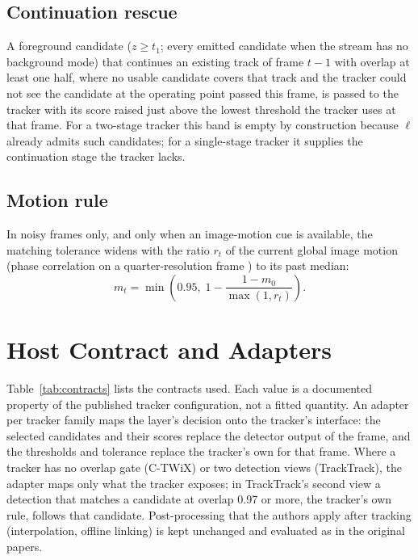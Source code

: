 \documentclass[journal]{new-aiaa}
\begin{document}
\subsection{Continuation rescue}
A foreground candidate ($z\ge t_1$; every emitted candidate when the stream has no background mode) that continues an existing track of frame $t-1$ with overlap at least one half, where no usable candidate covers that track and the tracker could not see the candidate at the operating point passed this frame, is passed to the tracker with its score raised just above the lowest threshold the tracker uses at that frame. For a two-stage tracker this band is empty by construction because $\ell$ already admits such candidates; for a single-stage tracker it supplies the continuation stage the tracker lacks.

\subsection{Motion rule}
In noisy frames only, and only when an image-motion cue is available, the matching tolerance widens with the ratio $r_t$ of the current global image motion (phase correlation on a quarter-resolution frame \cite{reddy1996phasecorr}) to its past median:
\begin{equation}
m_t=\min\left(0.95,\; 1-\frac{1-m_0}{\max(1,r_t)}\right).
\label{eq:motion}
\end{equation}

\section{Host Contract and Adapters}\label{sec:contract}
Table~\ref{tab:contracts} lists the contracts used. Each value is a documented property of the published tracker configuration, not a fitted quantity. An adapter per tracker family maps the layer's decision onto the tracker's interface: the selected candidates and their scores replace the detector output of the frame, and the thresholds and tolerance replace the tracker's own for that frame. Where a tracker has no overlap gate (C-TWiX) or two detection views (TrackTrack), the adapter maps only what the tracker exposes; in TrackTrack's second view a detection that matches a candidate at overlap 0.97 or more, the tracker's own rule, follows that candidate. Post-processing that the authors apply after tracking (interpolation, offline linking) is kept unchanged and evaluated as in the original papers.


\end{document}
